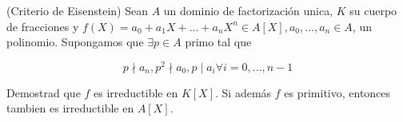 \question (Criterio de Eisenstein)
Sean $A$ un dominio de factorización unica, $K$ su cuerpo de fracciones y $f(X) = a_0 + a_1X + ... + a_nX^n \in A[X], a_0, ..., a_n \in A$, un polinomio. Supongamos que $\exists p \in A$ primo tal que 

\begin{equation}
p \nmid a_n, p^2 \nmid a_0, p\mid a_i \forall i = 0, ..., n-1
\end{equation}

Demostrad que $f$ es irreductible en $K[X]$. Si además $f$ es primitivo, entonces tambien es irreductible en $A[X]$.

